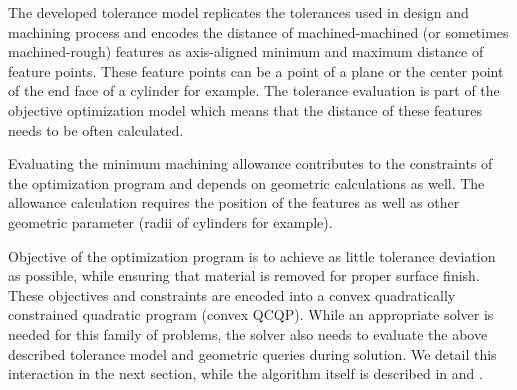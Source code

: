 \documentclass{juliacon}
\begin{document}



The developed tolerance model replicates the tolerances used in design and machining process and encodes the distance of machined-machined (or sometimes machined-rough) features as axis-aligned minimum and maximum distance of feature points.
These feature points can be a point of a plane or the center point of the end face of a cylinder for example.
The tolerance evaluation is part of the objective optimization model which means that the distance of these features needs to be often calculated.

Evaluating the minimum machining allowance contributes to the constraints of the optimization program and depends on geometric calculations as well.
The allowance calculation requires the position of the features as well as other geometric parameter (radii of cylinders for example).

Objective of the optimization program is to achieve as little tolerance deviation as possible, while ensuring that material is removed for proper surface finish.
These objectives and constraints are encoded into a convex quadratically constrained quadratic program (convex QCQP).
While an appropriate solver is needed for this family of problems, the solver also needs to evaluate the above described tolerance model and geometric queries during solution.
We detail this interaction in the next section, while the algorithm itself is described in \cite{cserteg:2023_CMS} and \cite{cserteg:2023_Annals}.
\end{document}
